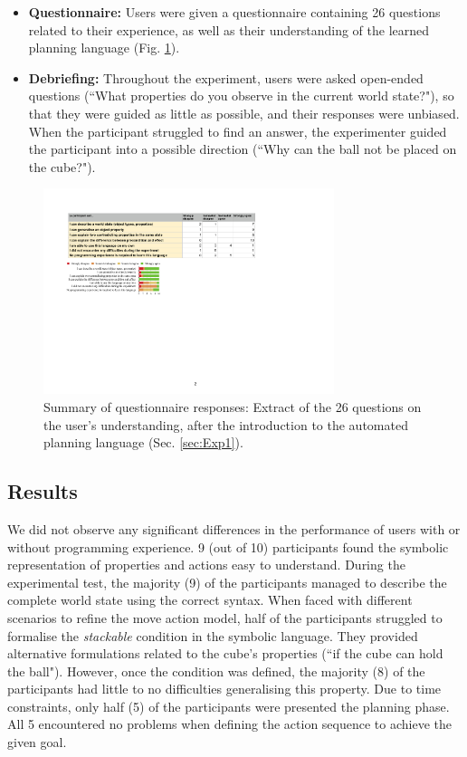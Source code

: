 \begin{itemize}
  \item{\textbf{Questionnaire:} Users were given a questionnaire containing 26 questions related to their experience, as well as their understanding of the learned planning language (Fig. \ref{fig:eEvaluation2}).}
   \item {\textbf{Debriefing:} Throughout the experiment, users were asked open-ended questions (``What properties do you observe in the current world state?"), so that they were guided as little as possible, and their responses were unbiased. When the participant struggled to find an answer, the experimenter guided the participant into a possible direction (``Why can the ball not be placed on the cube?").} 
\end{itemize}

 \begin{figure}[t]
  \centering
  \includegraphics[width=8.5cm]{figures/eEvaluation2}
  \caption{Summary of questionnaire responses: Extract of the 26 questions on the user's understanding, after the introduction to the automated planning language (Sec. \ref{sec:Exp1}).}
  \label{fig:eEvaluation2}
\end{figure} 
\subsection{Results}
We did not observe any significant differences in the performance of users with or without programming experience. 9 (out of 10) participants found the symbolic representation of properties and actions easy to understand. During the experimental test, the majority (9) of the participants managed to describe the complete world state using the correct syntax.
When faced with different scenarios to refine the move action model, half of the participants struggled to formalise the \textit{stackable} condition in the symbolic language. They provided alternative formulations related to the cube's properties (``if the cube can hold the ball").
However, once the condition was defined, the majority (8) of the participants had little to no difficulties generalising this property.
Due to time constraints, only half (5) of the participants were presented the planning phase. All 5 encountered no problems when defining the action sequence to achieve the given goal.

